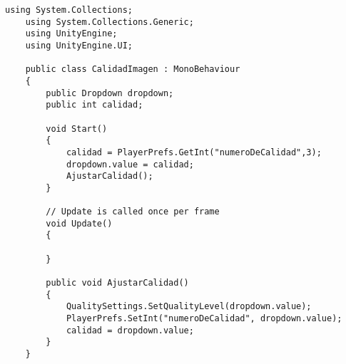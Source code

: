 \begin{lstlisting}[frame=single]
    using System.Collections;
    using System.Collections.Generic;
    using UnityEngine;
    using UnityEngine.UI;

    public class CalidadImagen : MonoBehaviour
    {
        public Dropdown dropdown;
        public int calidad;
        
        void Start()
        {
            calidad = PlayerPrefs.GetInt("numeroDeCalidad",3);
            dropdown.value = calidad;
            AjustarCalidad();
        }

        // Update is called once per frame
        void Update()
        {
            
        }
        
        public void AjustarCalidad()
        {
            QualitySettings.SetQualityLevel(dropdown.value);
            PlayerPrefs.SetInt("numeroDeCalidad", dropdown.value);
            calidad = dropdown.value;
        }
    }
\end{lstlisting}